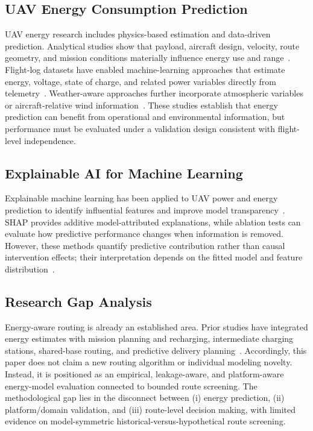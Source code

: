 \documentclass[conference,a4paper]{IEEEtran}
\begin{document}
\subsection{UAV Energy Consumption Prediction}
UAV energy research includes physics-based estimation and data-driven prediction. Analytical studies show that payload, aircraft design, velocity, route geometry, and mission conditions materially influence energy use and range~\cite{stolaroff2018,zhang2021}. Flight-log datasets have enabled machine-learning approaches that estimate energy, voltage, state of charge, and related power variables directly from telemetry~\cite{rodrigues2021,dai2024}. Weather-aware approaches further incorporate atmospheric variables or aircraft-relative wind information~\cite{somanagoudar2025,pang2026}. These studies establish that energy prediction can benefit from operational and environmental information, but performance must be evaluated under a validation design consistent with flight-level independence.

\subsection{Explainable AI for Machine Learning}
Explainable machine learning has been applied to UAV power and energy prediction to identify influential features and improve model transparency~\cite{abdellatif2025,luo2025,lundberg2017}. SHAP provides additive model-attributed explanations, while ablation tests can evaluate how predictive performance changes when information is removed. However, these methods quantify predictive contribution rather than causal intervention effects; their interpretation depends on the fitted model and feature distribution~\cite{janzing2020,kumar2020,aas2021}.

\subsection{Research Gap Analysis}
Energy-aware routing is already an established area. Prior studies have integrated energy estimates with mission planning and recharging, intermediate charging stations, shared-base routing, and predictive delivery planning~\cite{alyassi2023,pinto2022,meskar2024,ren2026}. Accordingly, this paper does not claim a new routing algorithm or individual modeling novelty. Instead, it is positioned as an empirical, leakage-aware, and platform-aware energy-model evaluation connected to bounded route screening. The methodological gap lies in the disconnect between (i) energy prediction, (ii) platform/domain validation, and (iii) route-level decision making, with limited evidence on model-symmetric historical-versus-hypothetical route screening.
\end{document}
